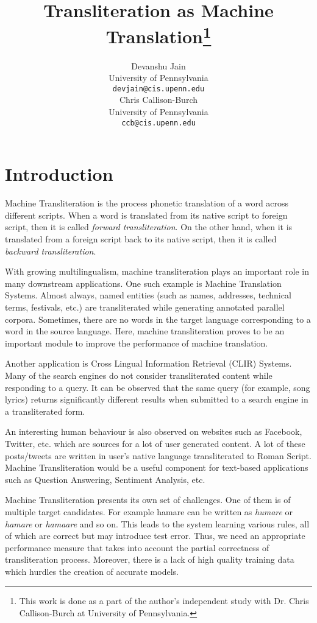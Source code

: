 \documentclass[11pt,a4paper]{article}
\title{Transliteration as Machine Translation\footnote{This work is done as a part of the author's independent study with Dr. Chris Callison-Burch at University of Pennsylvania.}}
\author{Devanshu Jain \\
  University of Pennsylvania \\
  {\tt devjain@cis.upenn.edu} \\\And
  Chris Callison-Burch \\
  University of Pennsylvania \\
  {\tt ccb@cis.upenn.edu} \\}
\date{}
\begin{document}
\maketitle
\begin{abstract}
 
\end{abstract}

\section{Introduction}
Machine Transliteration is the process phonetic translation of a word across different scripts. When a word is translated from its native script to foreign script, then it is called \textit{forward transliteration}. On the other hand, when it is translated from a foreign script back to its native script, then it is called \textit{backward transliteration}.
\par
With growing multilingualism, machine transliteration plays an important role in many downstream applications. One such example is Machine Translation Systems. Almost always, named entities (such as names, addresses, technical terms, festivals, etc.) are transliterated while generating annotated parallel corpora. Sometimes, there are no words in the target language corresponding to a word in the source language. Here, machine transliteration proves to be an important module to improve the performance of machine translation.
\par
Another application is Cross Lingual Information Retrieval (CLIR) Systems. Many of the search engines do not consider transliterated content while responding to a query. It can be observed that the same query (for example, song lyrics) returns significantly different results when submitted to a search engine in a transliterated form. 
\par
An interesting human behaviour is also observed on websites such as Facebook, Twitter, etc. which are sources for a lot of user generated content. A lot of these posts/tweets are written in user's native language transliterated to Roman Script. Machine Transliteration would be a useful component for text-based applications such as Question Answering, Sentiment Analysis, etc.
\par
Machine Transliteration presents its own set of challenges. One of them is of multiple target candidates. For example {hamare} can be written as \textit{humare} or \textit{hamare} or \textit{hamaare} and so on. This leads to the system learning various rules, all of which are correct but may introduce test error. Thus, we need an appropriate performance measure that takes into account the partial correctness of transliteration process. Moreover, there is a lack of high quality training data which hurdles the creation of accurate models.
\end{document}
